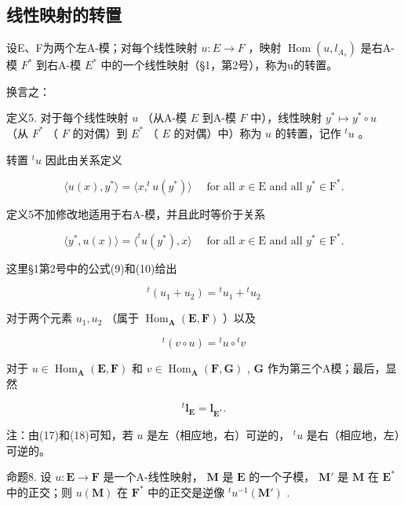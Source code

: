\subsection{线性映射的转置}

设E、F为两个左A-模；对每个线性映射 \(u: E \to F\) ，映射 \(\operatorname{Hom}(u, l_{A_s})\) 是右A-模 \(F^*\) 到右A-模 \(E^*\) 中的一个线性映射（§1，第2号），称为u的转置。

换言之：

定义5. 对于每个线性映射 \(u\) （从A-模 \(E\) 到A-模 \(F\) 中），线性映射 \(y^{*} \mapsto y^{*} \circ u\) （从 \(F^{*}\) （ \(F\) 的对偶）到 \(E^{*}\) （ \(E\) 的对偶）中）称为 \(u\) 的转置，记作 \(^{t}u\) 。

转置 \(^{t}u\) 因此由关系定义

\[
\langle u (x), y ^ {*} \rangle = \langle x, ^ {t} u (y ^ {*}) \rangle \quad \text { for   all } x \in \mathrm{E} \text { and   all } y ^ {*} \in \mathrm{F} ^ {*}.\tag{15}
\]

定义5不加修改地适用于右A-模，并且此时等价于关系

\[
\langle y ^ {*}, u (x) \rangle = \langle^ {t} u (y ^ {*}), x \rangle \quad \text { for   all } x \in \mathrm{E} \text { and   all } y ^ {*} \in \mathrm{F} ^ {*}.
\]

这里§1第2号中的公式(9)和(10)给出

\[
{ } ^ { t } ( u _ { 1 } + u _ { 2 } ) = { } ^ { t } u _ { 1 } + { } ^ { t } u _ { 2 }\tag{16}
\]

对于两个元素 \(u_{1}, u_{2}\) （属于 \(\operatorname{Hom}_{\mathbf{A}}(\mathbf{E}, \mathbf{F})\) ）以及

\[
{ } ^ { t } ( v \circ u ) = { } ^ { t } u \circ { } ^ { t } v\tag{17}
\]

对于 \(u \in \operatorname{Hom}_{\mathbf{A}}(\mathbf{E}, \mathbf{F})\) 和 \(v \in \operatorname{Hom}_{\mathbf{A}}(\mathbf{F}, \mathbf{G})\) , \(\mathbf{G}\) 作为第三个A模；最后，显然

\[
{ } ^ { t } \mathbf { l } _ { \mathbf { E } } = \mathbf { l } _ { \mathbf { E } ^ { * } } .\tag{18}
\]

注：由(17)和(18)可知，若 \(u\) 是左（相应地，右）可逆的， \(^{t}u\) 是右（相应地，左）可逆的。

命题8. 设 \(u: \mathbf{E} \to \mathbf{F}\) 是一个A-线性映射， \(\mathbf{M}\) 是 \(\mathbf{E}\) 的一个子模， \(\mathbf{M}'\) 是 \(\mathbf{M}\) 在 \(\mathbf{E}^*\) 中的正交；则 \(u(\mathbf{M})\) 在 \(\mathbf{F}^*\) 中的正交是逆像 \(^t u^{-1}(\mathbf{M}')\) .

